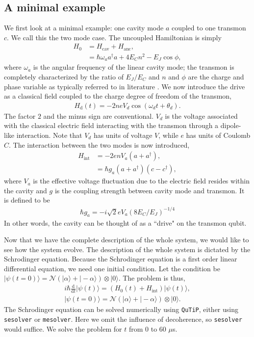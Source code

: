 \documentclass{article}
\begin{document}
\subsection{A minimal example}

We first look at a minimal example: one cavity mode $a$ coupled to one transmon $c$. We call this the two mode case. The uncoupled Hamiltonian is simply
\begin{align}
    H_0 &= H_{\text{cav}}+H_{\text{anc}},\\
    &=\hbar\omega_a a^\dagger a + 4E_C n^2-E_J\cos\phi,
\end{align}
where $\omega_a$ is the angular frequency of the linear cavity mode; the transmon is completely characterized by the ratio of $E_J/E_C$ and $n$ and $\phi$ are the charge and phase variable as typically referred to in literature \cite{koch07}. We now introduce the drive as a classical field coupled to the charge degree of freedom of the transmon,
\begin{align}
    H_{\text{d}}(t)=-2neV_d\cos(\omega_d t + \theta_d).
\end{align}
The factor $2$ and the minus sign are conventional. $V_d$ is the voltage associated with the classical electric field interacting with the transmon through a dipole-like interaction. Note that $V_d$ has units of voltage $V$, while $e$ has units of Coulomb $C$. The interaction between the two modes is now introduced,
\begin{align}
    H_{\text{int}} &= -2enV_a(a+a^\dagger),\\
    &=\hbar g_a(a+a^\dagger)(c-c^\dagger),
\end{align}
where $V_a$ is the effective voltage fluctuation due to the electric field resides within the cavity and $g$ is the coupling strength between cavity mode and transmon. It is defined to be \begin{align}
    \hbar g_a=-i\sqrt{2}eV_a(8E_C/E_J)^{-1/4}
\end{align}
In other words, the cavity can be thought of as a ``drive" on the transmon qubit.

Now that we have the complete description of the whole system, we would like to see how the system evolve. The description of the whole system is dictated by the Schrodinger equation. Because the Schrodinger equation is a first order linear differential equation, we need one initial condition. Let the condition be $|\psi(t=0)\rangle=\mathcal{N}\left(|\alpha\rangle+|-\alpha\rangle\right)\otimes |0\rangle$. The problem is thus,
\begin{align}
    i\hbar\frac{\text{d}}{\text{d}t}|\psi(t)\rangle = (H_0(t)+H_{\text{int}})|\psi(t)\rangle,\\
    |\psi(t=0)\rangle=\mathcal{N}\left(|\alpha\rangle+|-\alpha\rangle\right)\otimes |0\rangle.
\end{align}
The Schrodinger equation can be solved numerically using \texttt{QuTiP}, either using \texttt{sesolver} or \texttt{mesolver}. Here we omit the influence of decoherence, so \texttt{sesolver} would suffice. We solve the problem for $t$ from $0$ to $60$ $\mu$s. 
\end{document}
